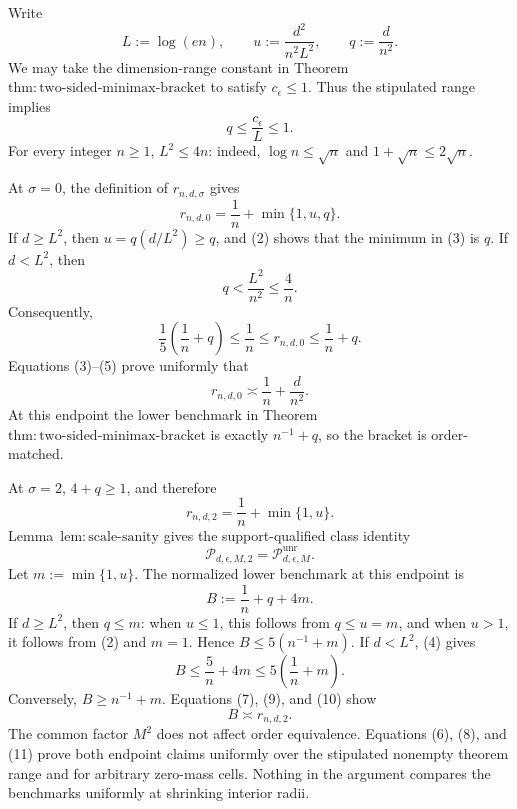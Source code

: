 Write
\[
 L:=\log(en),\qquad
 u:=\frac{d^2}{n^2L^2},\qquad
 q:=\frac d{n^2}.
\tag{1}
\]
We may take the dimension-range constant in Theorem~\(\mathrm{thm:two\text{-}sided\text{-}minimax\text{-}bracket}\) to satisfy \(c_{\epsilon}\le1\).  Thus the stipulated range implies
\[
 q\le\frac{c_{\epsilon}}L\le1.
\tag{2}
\]
For every integer \(n\ge1\), \(L^2\le4n\): indeed, \(\log n\le\sqrt n\) and \(1+\sqrt n\le2\sqrt n\).

At \(\sigma=0\), the definition of \(r_{n,d,\sigma}\) gives
\[
 r_{n,d,0}=\frac1n+\min\{1,u,q\}.
\tag{3}
\]
If \(d\ge L^2\), then \(u=q(d/L^2)\ge q\), and (2) shows that the minimum in (3) is \(q\).  If \(d<L^2\), then
\[
 q<\frac{L^2}{n^2}\le\frac4n.
\tag{4}
\]
Consequently,
\[
 \frac15\left(\frac1n+q\right)
 \le \frac1n
 \le r_{n,d,0}
 \le \frac1n+q.
\tag{5}
\]
Equations (3)--(5) prove uniformly that
\[
 r_{n,d,0}\asymp \frac1n+\frac d{n^2}.
\tag{6}
\]
At this endpoint the lower benchmark in Theorem~\(\mathrm{thm:two\text{-}sided\text{-}minimax\text{-}bracket}\) is exactly \(n^{-1}+q\), so the bracket is order-matched.

At \(\sigma=2\), \(4+q\ge1\), and therefore
\[
 r_{n,d,2}=\frac1n+\min\{1,u\}.
\tag{7}
\]
Lemma~\(\mathrm{lem:scale\text{-}sanity}\) gives the support-qualified class identity
\[
 \mathcal P_{d,\epsilon,M,2}=\mathcal P_{d,\epsilon,M}^{\mathrm{unr}}.
\tag{8}
\]
Let \(m:=\min\{1,u\}\).  The normalized lower benchmark at this endpoint is
\[
 B:=\frac1n+q+4m.
\tag{9}
\]
If \(d\ge L^2\), then \(q\le m\): when \(u\le1\), this follows from \(q\le u=m\), and when \(u>1\), it follows from (2) and \(m=1\).  Hence \(B\le5(n^{-1}+m)\).  If \(d<L^2\), (4) gives
\[
 B\le\frac5n+4m\le5\left(\frac1n+m\right).
\tag{10}
\]
Conversely, \(B\ge n^{-1}+m\).  Equations (7), (9), and (10) show
\[
 B\asymp r_{n,d,2}.
\tag{11}
\]
The common factor \(M^2\) does not affect order equivalence.  Equations (6), (8), and (11) prove both endpoint claims uniformly over the stipulated nonempty theorem range and for arbitrary zero-mass cells.  Nothing in the argument compares the benchmarks uniformly at shrinking interior radii.